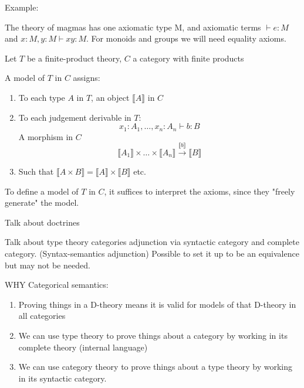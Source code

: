 Example:

The theory of magmas has one axiomatic type M, and axiomatic terms $\vdash e : M$ and $x : M, y : M \vdash xy : M$. For monoids and groups we will need equality axioms.

Let $T$ be a finite-product theory, $C$ a category with finite products

A model of $T$ in $C$ assigns:

\begin{enumerate}
\item To each type $A$ in $T$, an object $\llbracket A \rrbracket$ in $C$
\item To each judgement derivable in $T$:
    $$x_1 : A_1, \dots, x_n : A_n \vdash b : B$$
    A morphism in $C$
    $$\llbracket A_1 \rrbracket \times \dots \times \llbracket A_n \rrbracket \xrightarrow{\llbracket b \rrbracket} \llbracket B \rrbracket$$
\item Such that $\llbracket A \times B \rrbracket = \llbracket A \rrbracket \times \llbracket B \rrbracket$ etc.
\end{enumerate}

To define a model of $T$ in $C$, it suffices to interpret the axioms, since they "freely generate" the model.


Talk about doctrines

Talk about type theory categories adjunction via syntactic category and complete category. (Syntax-semantics adjunction) Possible to set it up to be an equivalence but may not be needed.

WHY Categorical semantics:
\begin{enumerate}
 \item Proving things in a D-theory means it is valid for models of that D-theory in all categories
 \item We can use type theory to prove things about a category by working in its complete theory (internal language)
 \item We can use category theory to prove things about a type theory by working in its syntactic category.
\end{enumerate}






